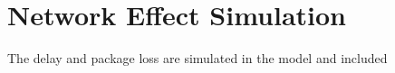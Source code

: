 \section{Network Effect Simulation}

The delay and package loss are simulated in the model and included